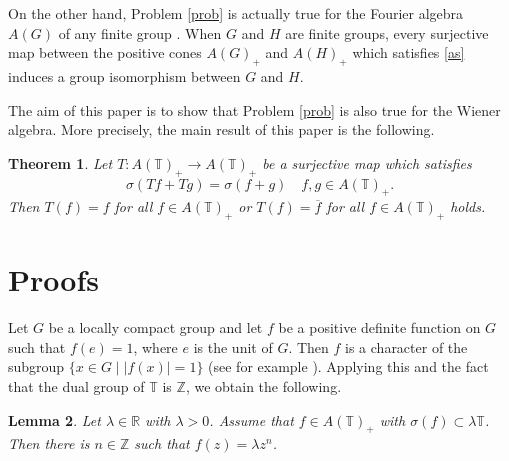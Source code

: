 \documentclass[10pt]{amsart}
\newtheorem{theorem}{Theorem}
\newtheorem{lemma}[theorem]{Lemma}
\begin{document}
On the other hand, Problem \ref{prob} is actually true for the Fourier algebra $A(G)$ of any finite group \cite[Theorem 2.5]{LO}. When $G$ and $H$ are finite groups, every surjective map between the positive cones $A(G)_{+}$ and  $A(H)_{+}$ which satisfies \eqref{as} induces a group isomorphism between $G$ and $H$. 

The aim of this paper is to show that Problem \ref{prob} is also true for the Wiener algebra.  More precisely, the main result of this paper is the following.
\begin{theorem}\label{main}
Let $T:A(\mathbb{T})_{+} \to A(\mathbb{T})_{+}$ be a surjective map which satisfies 
\begin{equation}\label{spectrumadditive}
\sigma(Tf+Tg)=\sigma(f+g) \quad  f, g \in A(\mathbb{T})_{+}.
\end{equation}
Then $T(f)=f $ for all $f \in A(\mathbb{T})_{+} $ or $T(f)=\overline{f}$ for all $f \in A(\mathbb{T})_{+} $  holds.
\end{theorem}

\section{Proofs}
Let $G$ be a locally compact group and let $f$ be a positive definite function on $G$ such that  $f(e)=1$, where $e$ is the unit of $G$. Then $f$ is a character of the subgroup $\{x \in G \mid |f(x)|=1\}$ (see for example \cite[Corollary 32.7]{HR}).  Applying this and the fact that the dual group of $\mathbb{T}$ is $\mathbb{Z}$, we obtain the following.
\begin{lemma}\label{1}
Let $\lambda \in \mathbb{R}$ with $\lambda>0$.  Assume that $f \in A(\mathbb{T})_{+}$ with  $\sigma(f) \subset \lambda \mathbb{T}$. Then there is $n \in \mathbb{Z}$ such that $f(z)=\lambda z^{n}$. 
\end{lemma}
\end{document}

